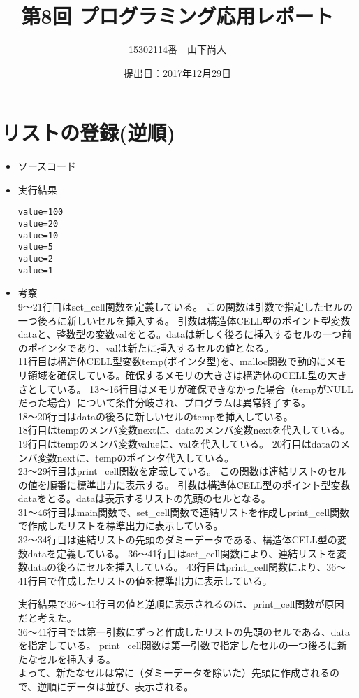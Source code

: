 \documentclass[a4paper]{jsarticle}
\title{第8回 プログラミング応用レポート}
\author{15302114番　山下尚人}
\date{提出日：2017年12月29日}
\begin{document}
\maketitle%

\section{リストの登録(逆順)}
	\begin{itemize}
	\item ソースコード
		 
		\mbox{}\newline
	\item 実行結果
		\begin{lstlisting}
value=100
value=20
value=10
value=5
value=2
value=1
		\end{lstlisting}
		\mbox{}\newline
	\item 考察\mbox{}\\
		9〜21行目はset\_cell関数を定義している。
		この関数は引数で指定したセルの一つ後ろに新しいセルを挿入する。
		引数は構造体CELL型のポイント型変数dataと、整数型の変数valをとる。dataは新しく後ろに挿入するセルの一つ前のポインタであり、valは新たに挿入するセルの値となる。\\
		11行目は構造体CELL型変数temp(ポインタ型)を、malloc関数で動的にメモリ領域を確保している。確保するメモリの大きさは構造体のCELL型の大きさとしている。
		13〜16行目はメモリが確保できなかった場合（tempがNULLだった場合）について条件分岐され、プログラムは異常終了する。\\
		18〜20行目はdataの後ろに新しいセルのtempを挿入している。\\
		18行目はtempのメンバ変数nextに、dataのメンバ変数nextを代入している。
		19行目はtempのメンバ変数valueに、valを代入している。
		20行目はdataのメンバ変数nextに、tempのポインタ代入している。\\
		
		23〜29行目はprint\_cell関数を定義している。
		この関数は連結リストのセルの値を順番に標準出力に表示する。
		引数は構造体CELL型のポイント型変数dataをとる。dataは表示するリストの先頭のセルとなる。\\
		
		31〜46行目はmain関数で、set\_cell関数で連結リストを作成しprint\_cell関数で作成したリストを標準出力に表示している。\\
		32〜34行目は連結リストの先頭のダミーデータである、構造体CELL型の変数dataを定義している。
		36〜41行目はset\_cell関数により、連結リストを変数dataの後ろにセルを挿入している。
		43行目はprint\_cell関数により、36〜41行目で作成したリストの値を標準出力に表示している。\\ \newpage	%
		
		実行結果で36〜41行目の値と逆順に表示されるのは、print\_cell関数が原因だと考えた。\\
		36〜41行目では第一引数にずっと作成したリストの先頭のセルである、dataを指定している。
		print\_cell関数は第一引数で指定したセルの一つ後ろに新たなセルを挿入する。\\
		よって、新たなセルは常に（ダミーデータを除いた）先頭に作成されるので、逆順にデータは並び、表示される。
	\end{itemize}
	
\end{document}
